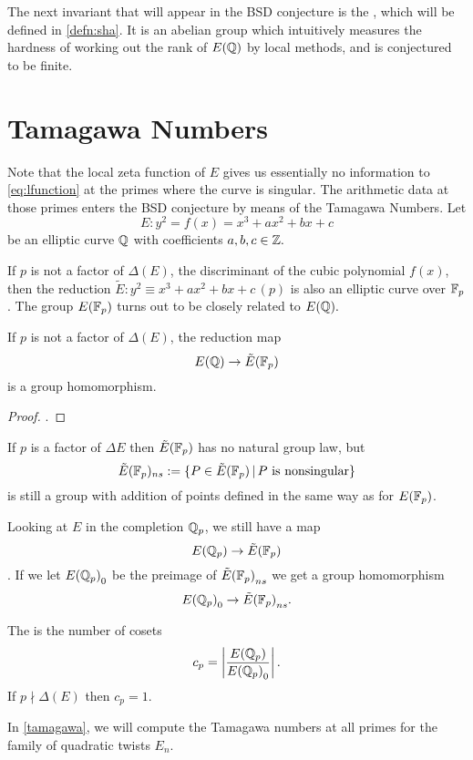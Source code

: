 \documentclass[12pt, a4paper]{report}
\begin{document}
The next invariant that will appear in the BSD conjecture is the
, which will
be defined in \autoref{defn:sha}. It is an abelian group which intuitively measures
the hardness of working out the rank of $E({\mathbb Q})$ by local methods, and is conjectured
to be finite.

\section{Tamagawa Numbers}

Note that the local zeta function of $E$ gives us essentially no
information to \autoref{eq:lfunction} at the primes where the curve is singular.
The arithmetic data at those
primes enters the BSD conjecture by means of the Tamagawa
Numbers. 
Let
$$ E : y^2 = f(x) = x^3 + ax^2 + bx + c $$
be an elliptic curve ${\mathbb Q}$ with coefficients $a,b,c \in {\mathbb Z}.$

If $p$ is not a factor of $\Delta(E)$, the discriminant of the cubic polynomial
$f(x)$,
then the reduction
$\tilde{E} : y^2 \equiv x^3 +ax^2 + b x + c \, (p)$ is
also an elliptic curve over $\mathbb{F}_p$. The group $E(\mathbb{F}_p)$ turns out to be
closely related to $E({\mathbb Q}).$

\begin{prop}
  If $p $ is not a factor of $ \Delta(E)$, the reduction map
  $$E({\mathbb Q}) \rightarrow \tilde{E}(\mathbb{F}_p)$$ is a group homomorphism.
\end{prop}
\begin{proof}
  \cite[See][Chapter IV, pages 121-123]{rational}.
\end{proof}

If $p $ is a factor of $\Delta E$ then $\tilde{E}(\mathbb{F}_p)$ has no natural group law, but
\[
  \tilde{E}(\mathbb{F}_p)_{ns} := \{P \in \tilde{E}(\mathbb{F}_p) \,|\, P \text{ is nonsingular}\}
  \]
is still a group with addition of points defined in the same way as for $E(\mathbb{F}_p)$.

Looking at $E$ in the completion ${\mathbb Q}_p$, we still have a map
\[{E({\mathbb Q}_p)} \rightarrow {\tilde{E}(\mathbb{F}_p)}\].
If we let ${E({\mathbb Q}_p)}_0$ be the preimage of ${\tilde{E}(\mathbb{F}_p)}_{ns}$ we get a group homomorphism
\[ {E({\mathbb Q}_p)}_0 \rightarrow {\tilde{E}(\mathbb{F}_p)}_{ns}. \]

\begin{defn}
  The  is the number of cosets 
  $$c_p = \left| \frac{{E({\mathbb Q}_p)}}{{E({\mathbb Q}_p)}_0}
  \right|.$$
  If $p \nmid \Delta(E)$ then $c_p = 1$.
\end{defn}  

In \autoref{tamagawa}, we will compute the Tamagawa numbers at all
primes for the family of quadratic twists $E_n$. 
  
\end{document}

